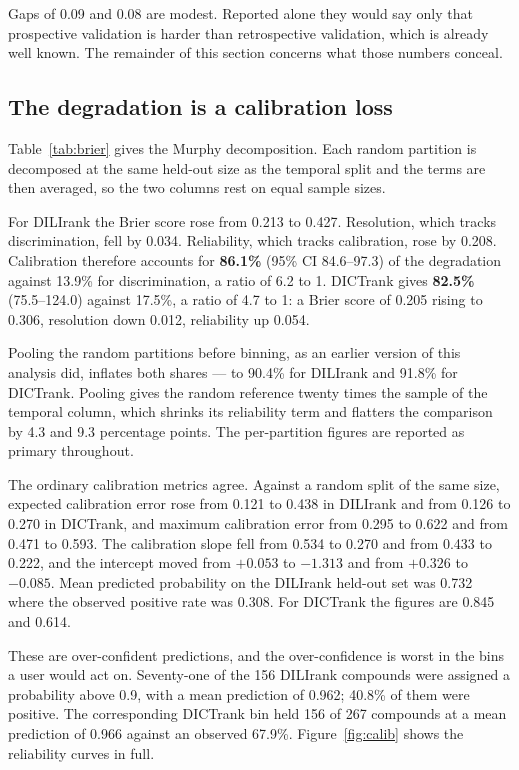 Gaps of 0.09 and 0.08 are modest. Reported alone they would say only that
prospective validation is harder than retrospective validation, which is already
well known. The remainder of this section concerns what those numbers conceal.

\subsection{The degradation is a calibration loss}

Table~\ref{tab:brier} gives the Murphy decomposition. Each random partition is
decomposed at the same held-out size as the temporal split and the terms are then
averaged, so the two columns rest on equal sample sizes.

For DILIrank the Brier score rose from 0.213 to 0.427. Resolution, which tracks
discrimination, fell by 0.034. Reliability, which tracks calibration, rose by
0.208. Calibration therefore accounts for \textbf{86.1\%} (95\% CI 84.6--97.3) of
the degradation against 13.9\% for discrimination, a ratio of 6.2 to 1. DICTrank
gives \textbf{82.5\%} (75.5--124.0) against 17.5\%, a ratio of 4.7 to 1: a Brier
score of 0.205 rising to 0.306, resolution down 0.012, reliability up 0.054.

Pooling the random partitions before binning, as an earlier version of this
analysis did, inflates both shares --- to 90.4\% for DILIrank and 91.8\% for
DICTrank. Pooling gives the random reference twenty times the sample of the
temporal column, which shrinks its reliability term and flatters the comparison by
4.3 and 9.3 percentage points. The per-partition figures are reported as primary
throughout.

The ordinary calibration metrics agree. Against a random split of the same size,
expected calibration error rose from 0.121 to 0.438 in DILIrank and from 0.126 to
0.270 in DICTrank, and maximum calibration error from 0.295 to 0.622 and from
0.471 to 0.593. The calibration slope fell from 0.534 to 0.270 and from 0.433 to
0.222, and the intercept moved from $+0.053$ to $-1.313$ and from $+0.326$ to
$-0.085$. Mean predicted probability on the DILIrank held-out set was 0.732 where
the observed positive rate was 0.308. For DICTrank the figures are 0.845 and
0.614.

These are over-confident predictions, and the over-confidence is worst in the bins
a user would act on. Seventy-one of the 156 DILIrank compounds were assigned a
probability above 0.9, with a mean prediction of 0.962; 40.8\% of them were
positive. The corresponding DICTrank bin held 156 of 267 compounds at a mean
prediction of 0.966 against an observed 67.9\%. Figure~\ref{fig:calib} shows the
reliability curves in full.

